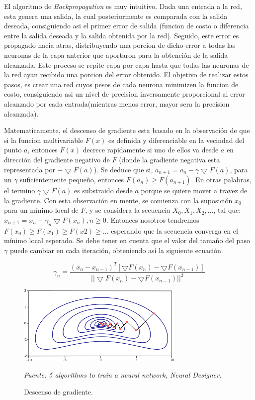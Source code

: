 El algoritmo de \textit{Backpropagation} es muy intuitivo. Dada una entrada a la red, esta genera una salida, la cual posteriormente es comparada con la salida deseada, consiguiendo asi el primer error de salida (funcion de costo o diferencia entre la salida deseada y la salida obtenida por la red). Seguido, este error es propagado hacia atras, distribuyendo una porcion de dicho error a todas las neuronas de la capa anterior que aportaron para la obtención de la salida alcanzada. Este proceso se repite capa por capa hasta que todas las neuronas de la red ayan recibido una porcion del error obtenido. El objetivo de realizar estos pasos, es crear una red cuyos pesos de cada neurona minimizen la funcion de costo, consiguiendo asi un nivel de precision inversamente proporcional al error alcanzado por cada entrada(mientras menos error, mayor sera la precision alcanzada).

Matematicamente, el descenso de gradiente esta basado en la observación de que si la funcion multivariable $F(x)$ es definida y  diferenciable en la vecindad del punto $a$, entonces $F(x)$ decrece rapidamente si uno de ellos va desde $a$ en dirección del gradiente negativo de $F$ (donde la gradiente negativa esta representada por $-\bigtriangledown F(a)$). Se deduce que si, $a_{n+1} = a_n - \gamma \bigtriangledown F(a)$, para un $\gamma$ suficientemente pequeño, entonces $F(a_n)\geq F(a_{n+1})$. En otras palabras, el termino $\gamma \bigtriangledown F(a)$ es substraido desde $a$ porque se quiere mover a travez de la gradiente.  Con esta observación en mente,  se comienza con la suposición $x_0$ para un mínimo local de $F$, y se considera la secuencia $X_0, X_1, X_2,...$, tal que: $x_{n+1} = x_n - \gamma_n \bigtriangledown F(x_n), n\geq0$. Entonces nosotros tendremos $F(x_0)\geq F(x_1) \geq F(x2) \geq ...$ esperando que la secuencia converga en el mínimo local esperado. Se debe tener en cuenta que el valor del tamaño del paso $\gamma$ puede cambiar en cada iteración, obteniendo así la siguiente ecuación.

\begin{equation}
\gamma_n=\frac{(x_n - x_{n-1})^T [\bigtriangledown F(x_n)-\bigtriangledown F(x_{n-1})]}{||\bigtriangledown F(x_n)-\bigtriangledown F(x_{n-1})||^2}
\end{equation}
\begin{figure}[H]
		\centering
		\includegraphics[width=80mm]{Imagenes/back_propagation.png}
		\caption{Descenso de gradiente.}
		\vspace{0.15cm}
		\textit{Fuente: 5 algorithms to train a neural network, Neural Designer.}
		\label{fig:back_propagation}
\end{figure}


